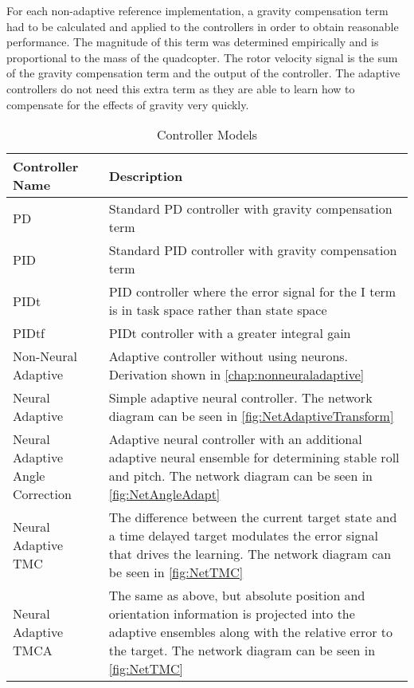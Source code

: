 \documentclass[letterpaper,12pt,titlepage,oneside,final]{book}
\begin{document}

For each non-adaptive reference implementation, a gravity compensation term had to be calculated and applied to the controllers in order to obtain reasonable performance. 
The magnitude of this term was determined empirically and is proportional to the mass of the quadcopter. 
The rotor velocity signal is the sum of the gravity compensation term and the output of the controller.
The adaptive controllers do not need this extra term as they are able to learn how to compensate for the effects of gravity very quickly.

\begin{table}
\caption{Controller Models} \label{table:controller_models}
\begin{center}
\begin{tabular}{| l | p{9cm} |}

\hline
\textbf{Controller Name} & \textbf{Description} \\ \hline
PD & Standard PD controller with gravity compensation term \\ \hline
PID & Standard PID controller with gravity compensation term \\ \hline
PIDt & PID controller where the error signal for the I term is in task space rather than state space \\ \hline
PIDtf & PIDt controller with a greater integral gain \\ \hline
Non-Neural Adaptive &  Adaptive controller without using neurons. Derivation shown in \autoref{chap:nonneuraladaptive} \\ \hline %
Neural Adaptive & Simple adaptive neural controller. The network diagram can be seen in \autoref{fig:NetAdaptiveTransform} \\ \hline
Neural Adaptive Angle Correction & Adaptive neural controller with an additional adaptive neural ensemble for determining stable roll and pitch. The network diagram can be seen in \autoref{fig:NetAngleAdapt} \\ \hline
Neural Adaptive TMC & The difference between the current target state and a time delayed target modulates the error signal that drives the learning. The network diagram can be seen in \autoref{fig:NetTMC} \\ \hline
Neural Adaptive TMCA & The same as above, but absolute position and orientation information is projected into the adaptive ensembles along with the relative error to the target. The network diagram can be seen in \autoref{fig:NetTMC} \\ \hline

\end{tabular}
\end{center}
\end{table}
\end{document}
